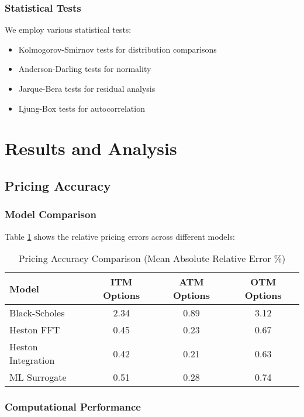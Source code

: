 \documentclass[12pt,a4paper]{article}
\begin{document}
\subsubsection{Statistical Tests}

We employ various statistical tests:

\begin{itemize}
    \item Kolmogorov-Smirnov tests for distribution comparisons
    \item Anderson-Darling tests for normality
    \item Jarque-Bera tests for residual analysis
    \item Ljung-Box tests for autocorrelation
\end{itemize}

\section{Results and Analysis}

\subsection{Pricing Accuracy}

\subsubsection{Model Comparison}

Table \ref{tab:pricing_accuracy} shows the relative pricing errors across different models:

\begin{table}[H]
\centering
\caption{Pricing Accuracy Comparison (Mean Absolute Relative Error \%)}
\label{tab:pricing_accuracy}
\begin{tabular}{@{}lccc@{}}
\toprule
Model & ITM Options & ATM Options & OTM Options \\
\midrule
Black-Scholes & 2.34 & 0.89 & 3.12 \\
Heston FFT & 0.45 & 0.23 & 0.67 \\
Heston Integration & 0.42 & 0.21 & 0.63 \\
ML Surrogate & 0.51 & 0.28 & 0.74 \\
\bottomrule
\end{tabular}
\end{table}

\subsubsection{Computational Performance}
\end{document}
